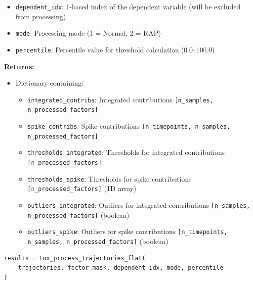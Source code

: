 \documentclass[11pt]{article}
\begin{document}
\begin{enumerate}
\begin{enumerate}
\begin{itemize}
	      	      	\item \texttt{dependent\_idx}: 1-based index of the dependent variable
	      	      	      (will be excluded from processing)
	      	      	      
	      	      	\item \texttt{mode}: Processing mode (1 = Normal, 2 = RAP)
	      	      	      
	      	      	\item \texttt{percentile}: Percentile value for threshold calculation
	      	      	      (0.0--100.0)
	      	      \end{itemize}
	      	      \textbf{Returns:}
	      	      \begin{itemize}
	      	      	\item Dictionary containing:
	      	      	      \begin{itemize}
	      	      	      	\item \texttt{integrated\_contribs}: Integrated contributions \texttt{[n\_samples,
	      	      	      	      n\_processed\_factors]}
	      	      	      	
	      	      	      	\item \texttt{spike\_contribs}: Spike contributions \texttt{[n\_timepoints,
	      	      	      	      n\_samples, n\_processed\_factors]}
	      	      	      	
	      	      	      	\item \texttt{thresholds\_integrated}: Thresholds for integrated
	      	      	      	      contributions \texttt{[n\_processed\_factors]}
	      	      	      	      
	      	      	      	\item \texttt{thresholds\_spike}: Thresholds for spike contributions
	      	      	      	      \texttt{[n\_processed\_factors]} (1D array)
	      	      	      	      
	      	      	      	\item \texttt{outliers\_integrated}: Outliers for integrated contributions
	      	      	      	      \texttt{[n\_samples, n\_processed\_factors]} (boolean)
	      	      	      	      
	      	      	      	\item \texttt{outliers\_spike}: Outliers for spike contributions
	      	      	      	      \texttt{[n\_timepoints, n\_samples, n\_processed\_factors]} (boolean)
	      	      	      \end{itemize}
	      	      \end{itemize}
	      	      \begin{lstlisting}[language=Python, caption={Complete Trajectory Processing with Global Threshold}]
results = tox_process_trajectories_flat(
    trajectories, factor_mask, dependent_idx, mode, percentile
)


\end{lstlisting}
\end{enumerate}
\end{enumerate}
\end{document}
